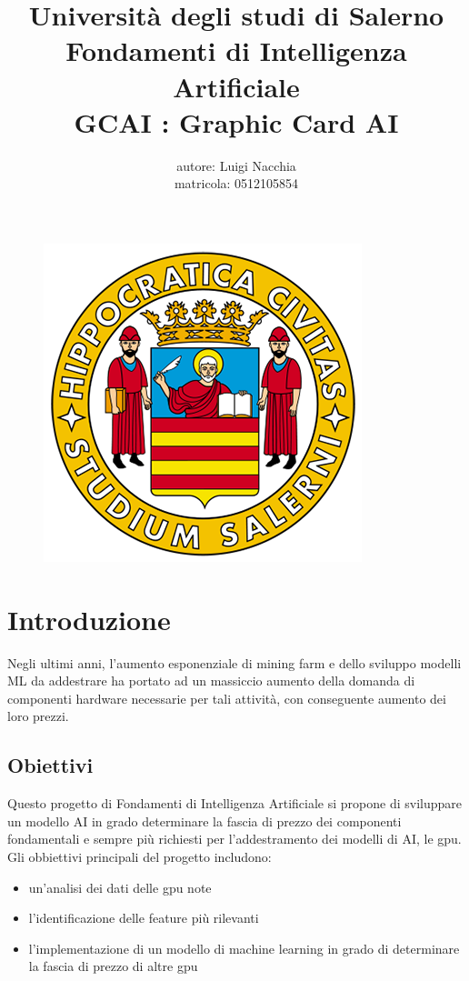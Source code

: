 \documentclass{article}
\title{Università degli studi di Salerno
        \\Fondamenti di Intelligenza Artificiale
        \\ GCAI : Graphic Card AI}
\author{autore: Luigi Nacchia\\matricola: 0512105854}
\date{}
\begin{document}
\begin{figure}
    \centering
    \includegraphics[width=0.95\linewidth]{logo_unisa.png}
\end{figure}

\maketitle

\newpage
\tableofcontents

\newpage
\section{Introduzione}
Negli ultimi anni, l'aumento esponenziale di mining farm e dello sviluppo modelli ML da addestrare ha portato ad un massiccio aumento della domanda di componenti hardware necessarie per tali attività, con conseguente aumento dei loro prezzi.

    \subsection{Obiettivi}
    Questo progetto di Fondamenti di Intelligenza Artificiale si propone di sviluppare un modello AI in grado determinare la fascia di prezzo dei componenti fondamentali e sempre più richiesti per l'addestramento dei modelli di AI, le gpu.
    \\
    Gli obbiettivi principali del progetto includono:
    \begin{itemize}
        \item un'analisi dei dati delle gpu note
        \item l'identificazione delle feature più rilevanti
        \item l'implementazione di un modello di machine learning in grado di determinare la fascia di prezzo di altre gpu
    \end{itemize}
    
\end{document}
